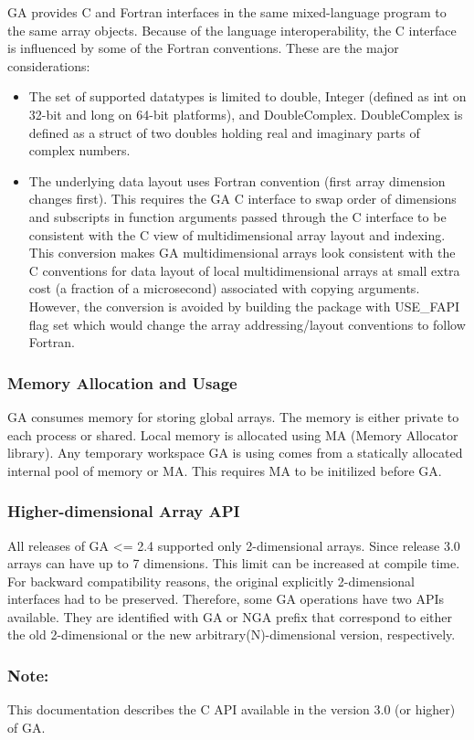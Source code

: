 GA provides C and Fortran interfaces in the same mixed-language program
to the same array objects. Because of the language interoperability,
the C interface is influenced by some of the Fortran conventions.
These are the major considerations:
\begin{itemize}
\item The set of supported datatypes is limited to double, Integer (defined
as int on 32-bit and long on 64-bit platforms), and DoubleComplex.
DoubleComplex is defined as a struct of two doubles holding real and
imaginary parts of complex numbers. 
\item The underlying data layout uses Fortran convention (first array dimension
changes first). This requires the GA C interface to swap order of
dimensions and subscripts in function arguments passed through the
C interface to be consistent with the C view of multidimensional array
layout and indexing. This conversion makes GA multidimensional arrays
look consistent with the C conventions for data layout of local multidimensional
arrays at small extra cost (a fraction of a microsecond) associated
with copying arguments. However, the conversion is avoided by building
the package with USE\_FAPI flag set which would change the array addressing/layout
conventions to follow Fortran.
\end{itemize}

\subsubsection*{Memory Allocation and Usage}

GA consumes memory for storing global arrays. The memory is either
private to each process or shared. Local memory is allocated using
MA (Memory Allocator library). Any temporary workspace GA is using
comes from a statically allocated internal pool of memory or MA. This
requires MA to be initilized before GA. 


\subsubsection*{Higher-dimensional Array API }

All releases of GA <= 2.4 supported only 2-dimensional arrays. Since
release 3.0 arrays can have up to 7 dimensions. This limit can be
increased at compile time. For backward compatibility reasons, the
original explicitly 2-dimensional interfaces had to be preserved.
Therefore, some GA operations have two APIs available. They are identified
with \textquotedbl{}GA\textquotedbl{} or \textquotedbl{}NGA\textquotedbl{}
prefix that correspond to either the old 2-dimensional or the new
arbitrary(N)-dimensional version, respectively. 


\subsubsection*{Note: }

This documentation describes the C API available in the version 3.0
(or higher) of GA. 
